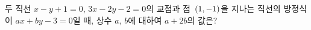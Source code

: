 두 직선 $x-y+1=0$, $3x-2y-2=0$의 교점과 점~$(1{,}\mkern3mu\mathopen{}-1)$을 지나는 직선의 방정식이 $ax+by-3=0$일 때, 상수 $a$, $b$에 대하여 $a+2b$의 값은?
